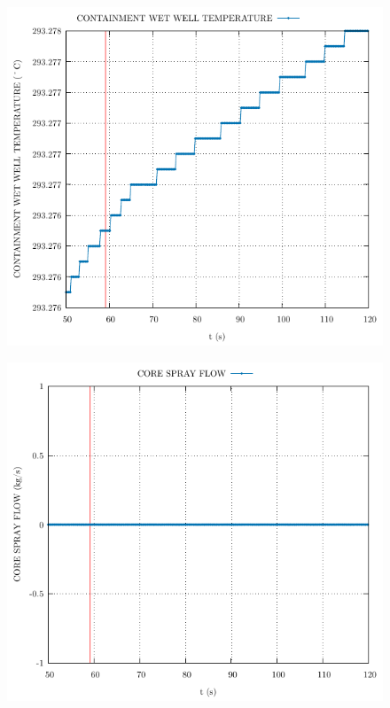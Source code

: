 \documentclass{article}
\begin{document}
\begin{multicols}{2}
\begin{figure}[H]
\end{figure}
\begin{figure}[H]
\centering
\includegraphics[width=\linewidth]{./graphs/CONTAINMENT WET WELL TEMPERATURE_comp.pdf}
\end{figure}
\begin{figure}[H]
\centering
\includegraphics[width=\linewidth]{./graphs/CORE SPRAY FLOW_comp.pdf}

\end{figure}
\end{multicols}
\end{document}
